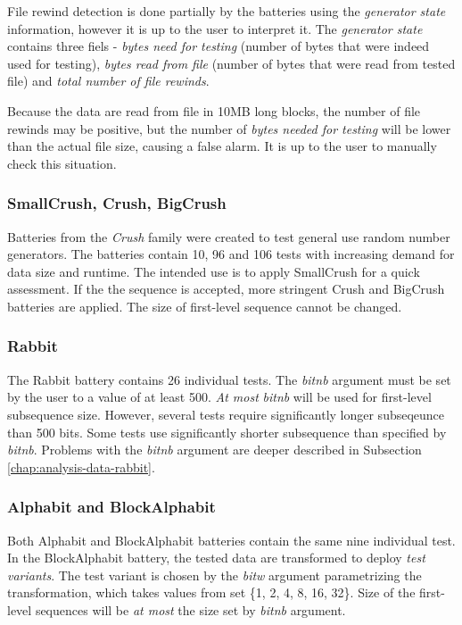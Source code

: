 \documentclass[
  digital,     %
  oneside,     %
  nosansbold,  %
  nocolorbold, %
  nolof,         %
  nolot,         %
]{fithesis4}
\begin{document}
File rewind detection is done partially by the batteries using the \emph{generator state} information, however it is up to the user to interpret it. The \emph{generator state} contains three fiels - \emph{bytes need for testing} (number of bytes that were indeed used for testing), \emph{bytes read from file} (number of bytes that were read from tested file) and \emph{total number of file rewinds}. 

Because the data are read from file in 10MB long blocks, the number of file rewinds may be positive, but the number of \emph{bytes needed for testing} will be lower than the actual file size, causing a false alarm. It is up to the user to manually check this situation. %


\subsubsection{SmallCrush, Crush, BigCrush}
Batteries from the \emph{Crush} family were created to test general use random number generators. The batteries contain 10, 96 and 106 tests with increasing demand for data size and runtime. The intended use is to apply SmallCrush for a quick assessment. If the the sequence is accepted, more stringent Crush and BigCrush batteries are applied. The size of first-level sequence cannot be changed. \cite[p. 242]{tu01_guide}

\subsubsection{Rabbit}
The Rabbit battery contains 26 individual tests. The \emph{bit\textunderscore nb} argument must be set by the user to a value of at least 500. \emph{At most} \emph{bit\textunderscore nb} will be used for first-level subsequence size. \cite[p. 152]{tu01_guide} However, several tests require significantly longer subseqeunce than 500 bits. Some tests use significantly shorter subsequence than specified by \emph{bit\textunderscore nb}. Problems with the \emph{bit\textunderscore nb} argument are deeper described in Subsection \ref{chap:analysis-data-rabbit}.

\subsubsection{Alphabit and BlockAlphabit}
Both Alphabit and BlockAlphabit batteries contain the same nine individual test. In the BlockAlphabit battery, the tested data are transformed to deploy \emph{test variants}. The test variant is chosen by the \emph{bit\textunderscore w} argument parametrizing the transformation, which takes values from set \{1, 2, 4, 8, 16, 32\}. \cite[p. 155]{tu01_guide} Size of the first-level sequences will be \emph{at most} the size set by \emph{bit\textunderscore nb} argument.
\end{document}
